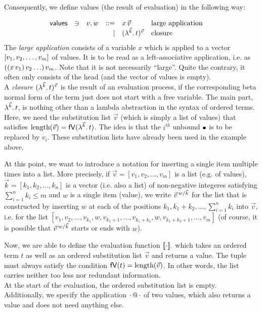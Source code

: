 \documentclass[submission,copyright,creativecommons]{eptcs}
\begin{document}
Consequently, we define values (the result of evaluation) in the following way:

\[ 
\begin{array}{lllrll@{\qquad}}
\mathsf{values}       & \ni & v,w & ::= & x \sspace \vec v & \mbox{large application} \\ 
			                   &&& \mid & \Val {\vec k} t {\vec v} & \mbox{closure} \\ 
\end{array}
\]
The \emph{large application} consists of a variable $x$ which is applied to a vector $\ve{v_1, v_2, \ldots, v_m}$ of values. It is to be read as a left-associative application, i.e. as $\pa{\pa{x \, v_1} v_2 \ldots } v_m$. 
Note that it is not necessarily ``large''. Quite the contrary, it often only consists of the head (and the vector of values is empty).\\
A \emph{closure} $\Val {\vec k} t {\vec v}$ is the result of an evaluation process, if the corresponding beta normal form of the term just does not start with a free variable. The main part, $\LaO {\vec k} t$, is nothing other than a lambda abstraction in the syntax of ordered terms.
Here, we need the substitution list $\vec v$ (which is simply a list of values) that satisfies $\length {\vec v} = \freevars{\LaO {\vec k} t}$. %
The idea is that the $i^{th}$ unbound $\ovar$ is to be replaced by $v_i$.  These substitution lists have already been used in the example above.


At this point, we want to introduce a notation for inserting a single item multiple times into a list. More precisely, if $\vec v = [v_1, v_2, \ldots, v_m]$ is a list (e.g. of values), $\vec k = [k_1, k_2, \ldots, k_n]$ is a vector (i.e. also a list) of  non-negative integeres satisfying $\sum_{i=1}^n k_i \leq m$ and $w$ is a single item (value), we write $\multiinsert {\vec v} {\vec k} {w}$  for the list that is constructed by inserting $w$ at each of the positions $k_1, k_1 + k_2, \ldots, \sum_{i=1}^n k_i$ into $\vec v$, i.e. for the list $[v_1, v_2, \ldots, v_{k_1}, w, v_{k_1 + 1}, \ldots, v_{k_1 + k_2}, w, v_{k_1 + k_2 + 1}, \ldots, v_m]$ (of course, it is possible that $\multiinsert {\vec v} {\vec k} {w}$ starts or ends with $w$).


Now, we are able to define the evaluation function $\ev {\cdot} {\cdot}$ which takes an ordered term $t$ as well as an ordered substitution list $\vec v$ and returns a value. The tuple must always satisfy the condition $\freevars t = \length {\vec v}$. In other words, the list carries neither too less nor redundant information.\\
At the start of the evaluation, the ordered substitution list is empty. \\
Additionally, we specify the application $\cdot \ap \cdot$ of two values, which also returns a value and does not need anything else.
\end{document}
